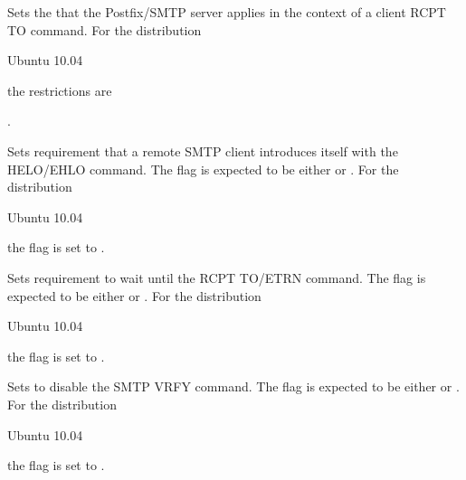 
Sets the  that the Postfix/SMTP server applies in the
context of a client RCPT TO command.
For the distribution
\begin{inparaitem}
\item[\TheDistribution{ubuntu}] Ubuntu 10.04
\end{inparaitem}
the restrictions are
\begin{compactitem}
\item {}.
\end{compactitem}


Sets requirement that a remote SMTP client introduces itself with the HELO/EHLO
command. The flag is expected to be either  or .
For the distribution
\begin{inparaitem}
\item[\TheDistribution{ubuntu}] Ubuntu 10.04
\end{inparaitem}
the flag is set to .


Sets requirement to wait until the RCPT TO/ETRN command. 
The flag is expected to be either  or .
For the distribution
\begin{inparaitem}
\item[\TheDistribution{ubuntu}] Ubuntu 10.04
\end{inparaitem}
the flag is set to .


Sets to disable the SMTP VRFY command.
The flag is expected to be either  or .
For the distribution
\begin{inparaitem}
\item[\TheDistribution{ubuntu}] Ubuntu 10.04
\end{inparaitem}
the flag is set to .
